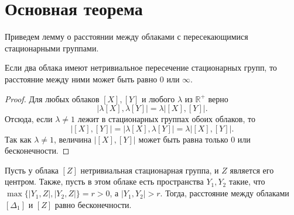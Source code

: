 \documentclass[11pt,twoside,draft
]{article}
\begin{document}
\section{Основная теорема}

Приведем лемму о расстоянии между облаками с пересекающимися
стационарными группами.
\begin{lemma}
  Если два облака имеют нетривиальное пересечение стационарных групп,
  то расстояние между ними может быть равно $0$ или $\infty$.
  \label{lemmaDist}
\end{lemma}
\begin{proof}
  Для любых облаков $[X], [Y]$ и любого $\lambda$ из $\mathbb{R}^{+}$ верно
  \[\big|\lambda[X], \lambda[Y]\big| = \lambda\big|[X], [Y]\big|.\]
  Отсюда, если $\lambda \neq 1$ лежит в стационарных группах обоих облаков, то
  \[\big|[X],[Y]\big| = \big|\lambda[X], \lambda[Y]\big| =
  \lambda\big|[X], [Y]\big|.\]
  Так как $\lambda \neq 1$, величина $\big|[X],[Y]\big|$ может быть равна
  только $0$ или бесконечности.
\end{proof}
\begin{theorem}
  Пусть у облака $[Z]$ нетривиальная стационарная группа, и $Z$
  является его центром. Также, пусть в этом облаке есть пространства
  $Y_{1}, Y_{2}$
  такие, что $\max\big\{ |Y_{1},Z|, |Y_{2}, Z| \big\} = r>0$, а
  $|Y_{1}, Y_{2}|>r$. Тогда, расстояние между облаками $[\Delta_1]$ и $[Z]$
  равно бесконечности.
  \label{thrmDist}
\end{theorem}
\end{document}
